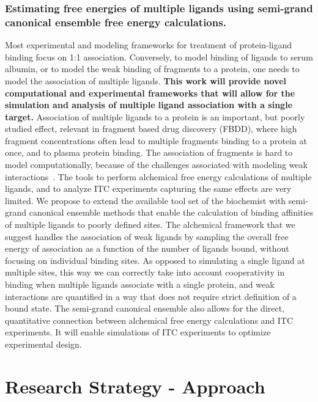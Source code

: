 \documentclass[10pt,final]{article}
\newif\ifinstr
\newcommand{\instr}[1]{\ifdraft{\ifinstr {\color{cyan}\emph{#1}} \fi}{}}
\begin{document}
\subsubsection*{Estimating free energies of multiple ligands using semi-grand canonical ensemble free energy calculations.}
Most experimental and modeling frameworks for treatment of protein-ligand binding focus on 1:1 association.
%
Conversely, to model binding of ligands to serum albumin, or to model the weak binding of fragments to a protein, one needs to model the association of multiple ligands.
%
\textbf{This work will provide novel computational and experimental frameworks that will allow for the simulation and analysis of multiple ligand association with a single target.}
%
Association of multiple ligands to a protein is an important, but poorly studied effect, relevant in fragment based drug discovery (FBDD), where high fragment concentrations often lead to multiple fragments binding to a protein at once, and to plasma protein binding. 
%
The association of fragments is hard to model computationally, because of the challenges associated with modeling weak interactions~\autocite{Gilson1997a}.
%
The tools to perform alchemical free energy calculations of multiple ligands, and to analyze ITC experiments capturing the same effects are very limited.
%
We propose to extend the available tool set of the biochemist with semi-grand canonical ensemble methods that enable the calculation of binding affinities of multiple ligands to poorly defined sites.
%
The alchemical framework that we suggest handles the association of weak ligands by sampling the overall free energy of association as a function of the number of ligands bound, without focusing on individual binding sites.
%
As opposed to simulating a single ligand at multiple sites, this way we can correctly take into account cooperativity in binding when multiple ligands associate with a single protein, and weak interactions are quantified in a way that does not require strict definition of a bound state.
%
The semi-grand canonical ensemble also allows for the direct, quantitative connection between alchemical free energy calculations and ITC experiments.
%
It will enable simulations of ITC experiments to optimize experimental design.

\section*{Research Strategy - Approach}
\instr{Approach: More specific background information. Describe in detail the experimental design and research methods to be used. Technical hurdles to be overcome should be mentioned. Alternative approaches should be given for experiments that may not be feasible. Discussion of expected or possible results and their interpretation. Best format for each specific aim: a) rationale, b) methods, c) expected results, d) alternatives. Theory aims should follow a similar structure where possible.}
\end{document}
